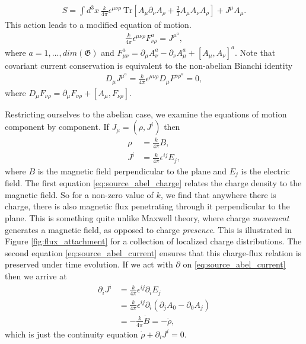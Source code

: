     \begin{align}
        S = \int d^3x \ \frac{k}{4 \pi} \epsilon^{\mu \nu \rho} \ \mathrm{Tr} \left[A_{\mu} \partial_{\nu} A_{\rho}+ \frac{2}{3} A_{\mu} A_{\nu} A_{\rho} \right] + J^{\mu} A_{\mu}.
    \end{align}
    This action leads to a modified equation of motion.
    \begin{align}
        \frac{k}{4 \pi} \epsilon^{\mu \nu \rho} F^a_{\nu \rho} = J^{\mu}^a,
    \end{align}
    where $a=1,...,dim(\mathfrak{G})$ and $F_{\mu \nu}^a = \partial_{\mu} A_{\nu}^a - \partial_{\nu} A_{\mu}^a + [A_{\mu}, A_{\nu}]^a$. Note that covariant current conservation is equivalent to the non-abelian Bianchi identity
    \begin{align}
        D_{\mu} J^{\mu}^a = \frac{k}{4 \pi} \epsilon^{\mu \nu \rho} D_{\mu} F^{\nu \rho}^a = 0,
    \end{align}
    where $D_{\mu} F_{\nu \rho} = \partial_{\mu} F_{\nu \rho} + [A_{\mu}, F_{\nu \rho}]$.

    Restricting ourselves to the abelian case, we examine the equations of motion component by component. If $J_{\mu} = (\rho, J^i)$ then
    \begin{align}
        \rho  &= \frac{k}{4 \pi} B \label{eq:source_abel_charge} ,\\
        J^i &= \frac{k}{4 \pi} \epsilon^{i j } E_j \label{eq:source_abel_current},
    \end{align}
    where $B$ is the magnetic field perpendicular to the plane and $E_j$ is the electric field. The first equation \eqref{eq:source_abel_charge} relates the charge density to the magnetic field. So for a non-zero value of $k$, we find that anywhere there is charge, there is also magnetic flux penetrating through it perpendicular to the plane. This is something quite unlike Maxwell theory, where charge \textit{movement} generates a magnetic field, as opposed to charge \textit{presence}. This is illustrated in  Figure \ref{fig:flux_attachment} for a collection of localized charge distributions. The second equation \eqref{eq:source_abel_current} ensures that this charge-flux relation is preserved under time evolution. If we act with $\partial$ on \eqref{eq:source_abel_current} then we arrive at
    \begin{align}
        \partial_i J^i &= \frac{k}{4 \pi} \epsilon^{ij} \partial_i E_j\nonumber \\
        &= \frac{k}{4 \pi} \epsilon^{ij} \partial_i ( \partial_j A_0 - \partial_0 A_j) \nonumber \\
        &= -\frac{k}{4 \pi} \dot{B} = -\dot{\rho},
    \end{align}
    which is just the continuity equation $\dot{\rho} + \partial_i J^i=0$.





